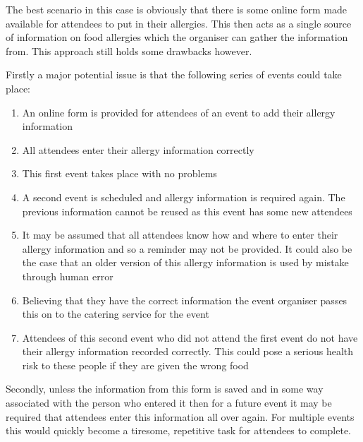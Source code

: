 The best scenario in this case is obviously that there is some online form made available for attendees to put in their allergies. This then acts as a single source of information on food allergies which the organiser can gather the information from. This approach still holds some drawbacks however. 

Firstly a major potential issue is that the following series of events could take place:

\begin{enumerate}
    \item An online form is provided for attendees of an event to add their allergy information
    \item All attendees enter their allergy information correctly
    \item This first event takes place with no problems
    \item A second event is scheduled and allergy information is required again. The previous information cannot be reused as this event has some new attendees
    \item It may be assumed that all attendees know how and where to enter their allergy information and so a reminder may not be provided. It could also be the case that an older version of this allergy information is used by mistake through human error
    \item Believing that they have the correct information the event organiser passes this on to the catering service for the event
    \item Attendees of this second event who did not attend the first event do not have their allergy information recorded correctly. This could pose a serious health risk to these people if they are given the wrong food
\end{enumerate}


Secondly, unless the information from this form is saved and in some way associated with the person who entered it then for a future event it may be required that attendees enter this information all over again. For multiple events this would quickly become a tiresome, repetitive task for attendees to complete.

